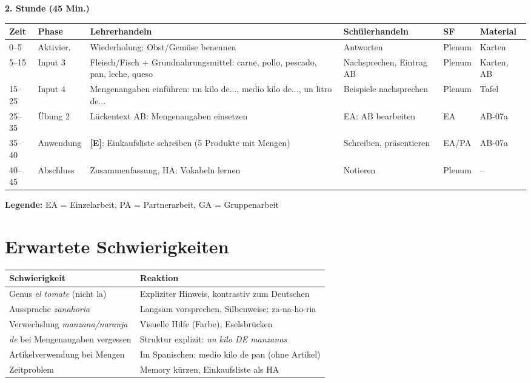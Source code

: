 \documentclass[11pt,a4paper]{article}
\newcommand{\E}{\textcolor{erweiterung}{\textbf{[E]}}}
\begin{document}
\vspace{1em}

\textbf{2. Stunde (45 Min.)}

\begin{longtable}{|p{1cm}|p{1.5cm}|p{4cm}|p{3cm}|p{1.5cm}|p{2cm}|}
\hline
\textbf{Zeit} & \textbf{Phase} & \textbf{Lehrerhandeln} & \textbf{Schülerhandeln} & \textbf{SF} & \textbf{Material} \\
\hline
\endhead

0--5 & Aktivier. & Wiederholung: Obst/Gemüse benennen & Antworten & Plenum & Karten \\
\hline

5--15 & Input 3 & Fleisch/Fisch + Grundnahrungsmittel: carne, pollo, pescado, pan, leche, queso & Nachsprechen, Eintrag AB & Plenum & Karten, AB \\
\hline

15--25 & Input 4 & Mengenangaben einführen: un kilo de..., medio kilo de..., un litro de... & Beispiele nachsprechen & Plenum & Tafel \\
\hline

25--35 & Übung 2 & Lückentext AB: Mengenangaben einsetzen & EA: AB bearbeiten & EA & AB-07a \\
\hline

35--40 & Anwendung & \E{}: Einkaufsliste schreiben (5 Produkte mit Mengen) & Schreiben, präsentieren & EA/PA & AB-07a \\
\hline

40--45 & Abschluss & Zusammenfassung, HA: Vokabeln lernen & Notieren & Plenum & -- \\
\hline
\end{longtable}

\textbf{Legende:} EA = Einzelarbeit, PA = Partnerarbeit, GA = Gruppenarbeit

\section{Erwartete Schwierigkeiten}

\begin{tabular}{|p{4.5cm}|p{8cm}|}
\hline
\textbf{Schwierigkeit} & \textbf{Reaktion} \\
\hline
Genus \textit{el tomate} (nicht la) & Expliziter Hinweis, kontrastiv zum Deutschen \\
\hline
Aussprache \textit{zanahoria} & Langsam vorsprechen, Silbenweise: za-na-ho-ria \\
\hline
Verwechslung \textit{manzana/naranja} & Visuelle Hilfe (Farbe), Eselsbrücken \\
\hline
\textit{de} bei Mengenangaben vergessen & Struktur explizit: \textit{un kilo DE manzanas} \\
\hline
Artikelverwendung bei Mengen & Im Spanischen: medio kilo de pan (ohne Artikel) \\
\hline
Zeitproblem & Memory kürzen, Einkaufsliste als HA \\
\hline
\end{tabular}
\end{document}
